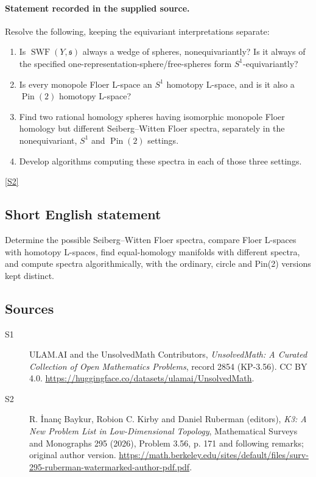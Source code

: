 \documentclass[11pt]{article}
\newcommand{\sref}[2]{\hyperlink{source:#1:#2}{[S#2]}}
\begin{document}
\paragraph{Statement recorded in the supplied source.}
Resolve the following, keeping the equivariant interpretations separate:
\begin{enumerate}
\item Is $\operatorname{SWF}(Y,\mathfrak s)$ always a wedge of spheres, nonequivariantly? Is it always of the specified one-representation-sphere/free-spheres form $S^1$-equivariantly?
\item Is every monopole Floer L-space an $S^1$ homotopy L-space, and is it also a $\operatorname{Pin}(2)$ homotopy L-space?
\item Find two rational homology spheres having isomorphic monopole Floer homology but different Seiberg--Witten Floer spectra, separately in the nonequivariant, $S^1$ and $\operatorname{Pin}(2)$ settings.
\item Develop algorithms computing these spectra in each of those three settings.
\end{enumerate}
\sref{2854}{2}
\subsection{Short English statement}
Determine the possible Seiberg--Witten Floer spectra, compare Floer L-spaces with homotopy L-spaces, find equal-homology manifolds with different spectra, and compute spectra algorithmically, with the ordinary, circle and Pin(2) versions kept distinct.
\subsection{Sources}
\begin{description}
\item[\hypertarget{source:2854:1}{S1}] ULAM.AI and the UnsolvedMath Contributors, \emph{UnsolvedMath: A Curated Collection of Open Mathematics Problems}, record 2854 (KP-3.56). CC BY 4.0. \url{https://huggingface.co/datasets/ulamai/UnsolvedMath}.
\item[\hypertarget{source:2854:2}{S2}] R. İnanç Baykur, Robion C. Kirby and Daniel Ruberman (editors), \emph{K3: A New Problem List in Low-Dimensional Topology}, Mathematical Surveys and Monographs 295 (2026), Problem 3.56, p. 171 and following remarks; original author version. \url{https://math.berkeley.edu/sites/default/files/surv-295-ruberman-watermarked-author-pdf.pdf}.
\end{description}
\label{end:2854}
\end{document}
